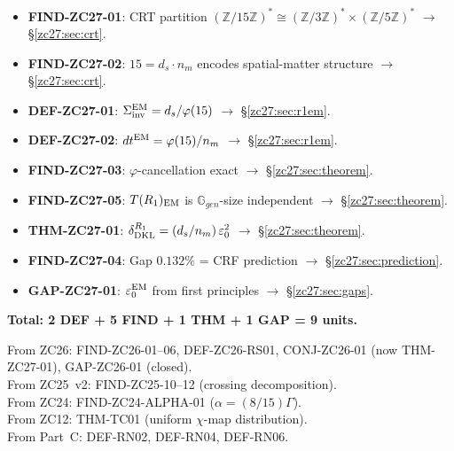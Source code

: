 \documentclass[12pt, a4paper]{article}
\begin{document}
\begin{formalbox}[title={Atomic Units Introduced by TASK-ZC27
  (9 units)}]
\begin{itemize}[leftmargin=*,noitemsep]
  \item \textbf{FIND-ZC27-01}: CRT partition
    $(\mathbb{Z}/15\mathbb{Z})^*
    \cong (\mathbb{Z}/3\mathbb{Z})^*\times(\mathbb{Z}/5\mathbb{Z})^*$
    $\to$ \S\ref{zc27:sec:crt}.
  \item \textbf{FIND-ZC27-02}: $15 = d_s \cdot n_m$ encodes
    spatial-matter structure $\to$ \S\ref{zc27:sec:crt}.
  \item \textbf{DEF-ZC27-01}: $\Sigma_{\rm inv}^{\rm EM}
    = d_s/\varphi(15)$ $\to$ \S\ref{zc27:sec:r1em}.
  \item \textbf{DEF-ZC27-02}: $dt^{\rm EM} = \varphi(15)/n_m$
    $\to$ \S\ref{zc27:sec:r1em}.
  \item \textbf{FIND-ZC27-03}: $\varphi$-cancellation exact
    $\to$ \S\ref{zc27:sec:theorem}.
  \item \textbf{FIND-ZC27-05}: $T(R_1)_{\rm EM}$ is
    $\mathbb{G}_{gen}$-size independent $\to$ \S\ref{zc27:sec:theorem}.
  \item \textbf{THM-ZC27-01}: $\delta_{\rm DKL}^{R_1}
    = (d_s/n_m)\,\varepsilon_0^2$
    $\to$ \S\ref{zc27:sec:theorem}.
  \item \textbf{FIND-ZC27-04}: Gap $0.132\%$ = CRF prediction
    $\to$ \S\ref{zc27:sec:prediction}.
  \item \textbf{GAP-ZC27-01}: $\varepsilon_0^{\rm EM}$
    from first principles $\to$ \S\ref{zc27:sec:gaps}.
\end{itemize}
\textbf{Total: 2 DEF + 5 FIND + 1 THM + 1 GAP = 9 units.}
\end{formalbox}

\begin{formalbox}[title={Atomic Units Inherited (not modified)}]
From ZC26: FIND-ZC26-01--06, DEF-ZC26-RS01,
  CONJ-ZC26-01 (now THM-ZC27-01), GAP-ZC26-01 (closed).\\
From ZC25~v2: FIND-ZC25-10--12 (crossing decomposition).\\
From ZC24: FIND-ZC24-ALPHA-01 ($\alpha=(8/15)\Gamma$).\\
From ZC12: THM-TC01 (uniform $\chi$-map distribution).\\
From Part~C: DEF-RN02, DEF-RN04, DEF-RN06.
\end{formalbox}
\end{document}
